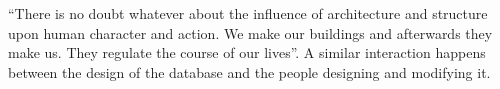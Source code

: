  “There is no doubt whatever about the influence of architecture and structure upon human character and action. We make our buildings and afterwards they make us. They regulate the course of our lives”. A similar interaction happens between the design of the database and the people designing and modifying it.